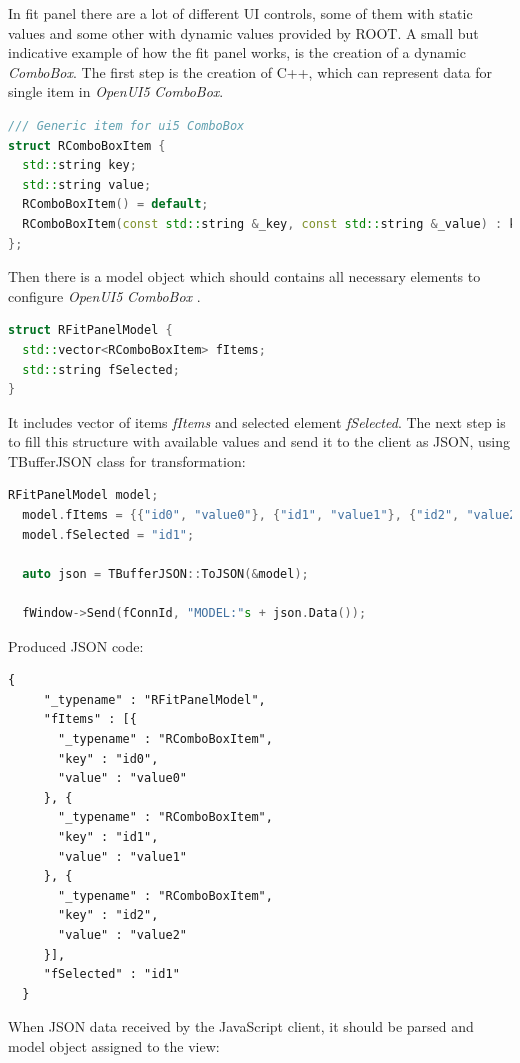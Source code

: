 \documentclass[a4paper]{jpconf}
\begin{document}
In fit panel there are a lot of different UI controls, some of them with static values and some other with dynamic values provided by ROOT. A small but indicative example of how the fit panel works, is the creation of a dynamic \textit{ComboBox}.
The first step is the creation of C++, which can represent data for single item in \textit{OpenUI5} \textit{ComboBox}.
\\
\begin{lstlisting}[language=C++]
/// Generic item for ui5 ComboBox
struct RComboBoxItem {
  std::string key;
  std::string value;
  RComboBoxItem() = default;
  RComboBoxItem(const std::string &_key, const std::string &_value) : key(_key), value(_value) {}
};
\end{lstlisting}
\noindent
Then there is a model object which should contains all necessary elements to configure \textit{OpenUI5} \textit{ComboBox} .

\begin{lstlisting}[language=C++]
struct RFitPanelModel {
  std::vector<RComboBoxItem> fItems;
  std::string fSelected;
}
\end{lstlisting}
\noindent
It includes vector of items \textit{fItems} and selected element \textit{fSelected}.
The next step is to fill this structure with available values and send it to the client as JSON, using TBufferJSON class for transformation:

\begin{lstlisting}[language=C++]
  RFitPanelModel model;
  model.fItems = {{"id0", "value0"}, {"id1", "value1"}, {"id2", "value2"}};
  model.fSelected = "id1";

  auto json = TBufferJSON::ToJSON(&model);

  fWindow->Send(fConnId, "MODEL:"s + json.Data());
\end{lstlisting}

\noindent Produced JSON code:

\begin{lstlisting}[language=XML]
  {
     "_typename" : "RFitPanelModel",
     "fItems" : [{
       "_typename" : "RComboBoxItem",
       "key" : "id0",
       "value" : "value0"
     }, {
       "_typename" : "RComboBoxItem",
       "key" : "id1",
       "value" : "value1"
     }, {
       "_typename" : "RComboBoxItem",
       "key" : "id2",
       "value" : "value2"
     }],
     "fSelected" : "id1"
  }
\end{lstlisting}
\noindent
When JSON data received by the JavaScript client, it should be parsed and model object assigned to the view:
\end{document}
